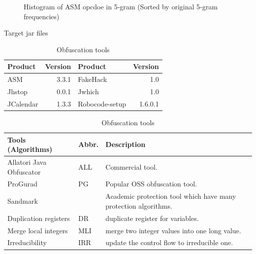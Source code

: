 \documentclass[conference]{IEEEtran}
\newlength{\graphwidth}
\begin{document}
\begin{figure}[bt]
\begin{minipage}[b]{\graphwidth}
    \label{fig:asm-5gram-MLI-histogram}%
  \end{minipage}
  \caption{Histogram of ASM opcdoe in 5-gram (Sorted by original 5-gram frequencies)}
  \label{fig:asm-5gram-histogram}
\end{figure}

\begin{table}[t]
  \centering
  \footnotesize{
    \caption{Target jar files}\label{table:jars}
  \begin{tabular}{l|r||l|r}
    \textbf{Product} & \textbf{Version} & \textbf{Product} & \textbf{Version} \\ \hline
    ASM       & 3.3.1 & FakeHack  & 1.0 \\
    Jhstop    & 0.0.1 & Jwhich    & 1.0  \\
    JCalendar & 1.3.3 & Robocode-setup & 1.6.0.1  \\
  \end{tabular}
  \vspace{0.5cm}
  \caption{Obfuscation tools}\label{table:tools}
  \begin{tabular}{ll|p{4cm}}
      \textbf{Tools (Algorithms)} & \textbf{Abbr.} & \textbf{Description} \\ \hline
      Allatori Java Obfuscator\footnotemark[1] & ALL & Commercial tool. \\ \hline
      ProGurad\footnotemark[2]                 & PG  & Popular OSS obfuscation tool. \\ \hline
      Sandmark\footnotemark[3]                 &     & Academic protection tool which have many protection algorithms. \\
      \hspace{0.1cm} Duplication registers & DR & duplicate register for variables. \\
      \hspace{0.1cm} Merge local integers & MLI & merge two integer values into one long value.\\
      \hspace{0.1cm} Irreducibility       & IRR & update the control flow to irreducible one.\\
  \end{tabular}}
\end{table}
\end{document}
